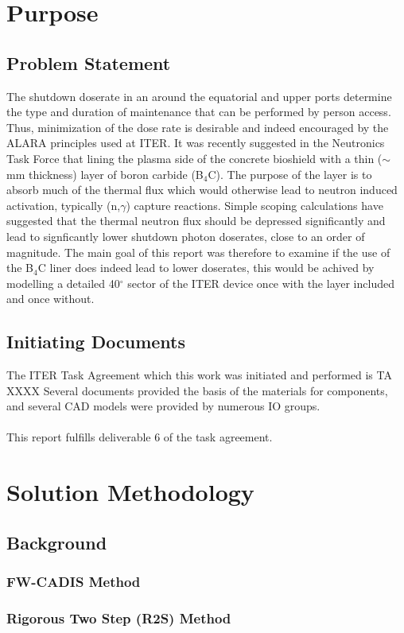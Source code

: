 \documentclass[12pt]{article}
\begin{document}
\section{Purpose}
\subsection{Problem Statement}
The shutdown doserate in an around the equatorial and upper ports determine the
type and duration of maintenance that can be performed by person access. Thus,
minimization of the dose rate is desirable and indeed encouraged by the ALARA
principles used at ITER. It was recently suggested in the Neutronics Task Force
that lining the plasma side of the concrete bioshield with a thin ($\sim$ mm
thickness) layer of boron carbide (B$_4$C). The purpose of the layer is to
absorb much of the thermal flux which would otherwise lead to neutron induced
activation, typically (n,$\gamma$) capture reactions. Simple scoping
calculations have suggested that the thermal neutron flux should be depressed
significantly and lead to signficantly lower shutdown photon doserates, close
to an order of magnitude. The main goal of this report was therefore to examine
if the use of the B$_4$C liner does indeed lead to lower doserates, this would
be achived by modelling a detailed 40$^{\circ}$ sector of the ITER device once
with the layer included and once without.
\subsection{Initiating Documents}
The ITER Task Agreement which this work was initiated and performed is TA XXXX
Several documents provided the basis of the materials for components, and
several CAD models were provided by numerous IO groups.
\\
\\
This report fulfills deliverable 6 of the task agreement.
\newpage
\section{Solution Methodology}
\subsection{Background}
\subsubsection{FW-CADIS Method}
\subsubsection{Rigorous Two Step (R2S) Method}
\end{document}
